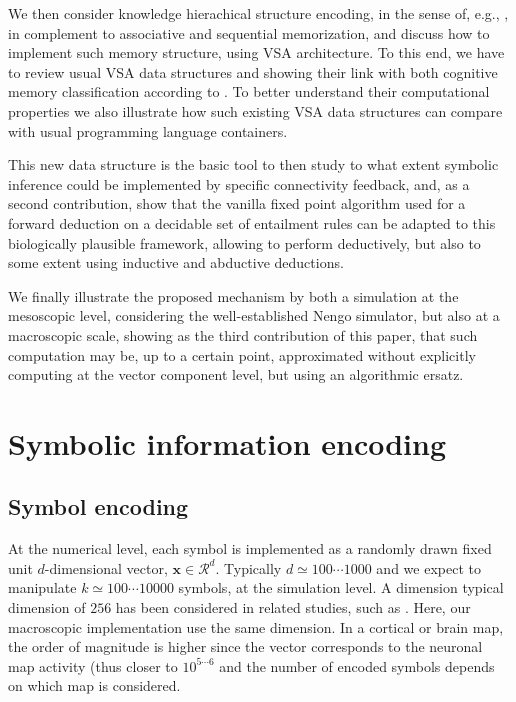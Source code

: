 \documentclass[sn-mathphys]{sn-jnl}
\begin{document}
We then consider knowledge hierachical structure encoding, in the sense of, e.g., \cite{eichenbaum_memory_2017}, in complement to associative and sequential memorization, and discuss how to implement such memory structure, using VSA architecture. To this end, we have to review usual VSA data structures and showing their link with both cognitive memory classification according to \cite{eichenbaum_memory_2017}. To better understand their computational properties we also illustrate how such existing VSA data structures can compare with usual programming language containers. 

This new data structure is the basic tool to then study to what extent symbolic inference could be implemented by specific connectivity feedback, and, as a second contribution, show that the vanilla fixed point algorithm used for a forward deduction on a decidable set of entailment rules can be adapted to this biologically plausible framework, allowing to perform deductively, but also to some extent using inductive and abductive deductions.

We finally illustrate the proposed mechanism by both a simulation at the mesoscopic level, considering the well-established Nengo simulator, but also at a macroscopic scale, showing as the third contribution of this paper, that such computation may be, up to a certain point, approximated without explicitly computing at the vector component level, but using an algorithmic ersatz.


\section{Symbolic information encoding} \label{encoding}

\subsection{Symbol encoding} \label{symbol-encoding}

At the numerical level, each symbol is implemented as a randomly drawn fixed unit $d$-dimensional vector, $\mathbf{x} \in {\mathcal R}^d$. Typically $d\simeq 100 \cdots 1000$ and we expect to manipulate $k\simeq 100 \cdots 10000$ symbols, at the simulation level. A dimension typical dimension of $256$ has been considered in related studies, such as \cite{mercier_ontology_2021}. Here, our macroscopic implementation use the same dimension. In a cortical or brain map, the order of magnitude is higher since the vector corresponds to the neuronal map activity (thus closer to $10^{5\cdots 6}$ and the number of encoded symbols depends on which map is considered.
\end{document}
